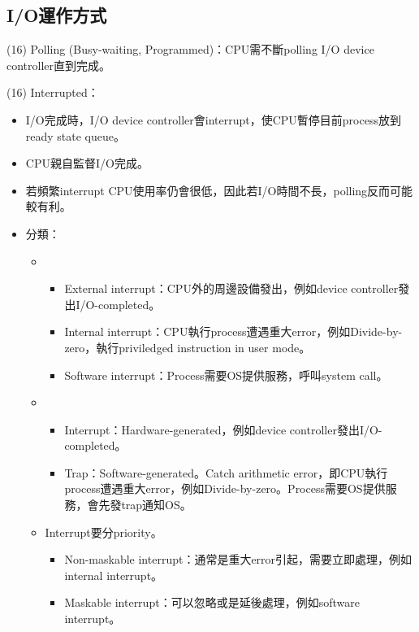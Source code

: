 \subsection{I/O運作方式}

\begin{theorem}{(16)} Polling (Busy-waiting, Programmed)：CPU需不斷polling I/O device controller直到完成。
\end{theorem}

\begin{theorem}{(16)} Interrupted：\begin{itemize}
        \item I/O完成時，I/O device controller會interrupt，使CPU暫停目前process放到ready state queue。
        \item CPU親自監督I/O完成。
        \item 若頻繁interrupt CPU使用率仍會很低，因此若I/O時間不長，polling反而可能較有利。
        \item 分類：\begin{itemize}
            \item \begin{itemize}
                \item External interrupt：CPU外的周邊設備發出，例如device controller發出I/O-completed。
                \item Internal interrupt：CPU執行process遭遇重大error，例如Divide-by-zero，執行priviledged instruction in user mode。
                \item Software interrupt：Process需要OS提供服務，呼叫system call。
            \end{itemize}
            \item \begin{itemize}
                \item Interrupt：Hardware-generated，例如device controller發出I/O-completed。
                \item Trap：Software-generated。Catch arithmetic error，即CPU執行process遭遇重大error，例如Divide-by-zero。Process需要OS提供服務，會先發trap通知OS。
            \end{itemize}
            \item Interrupt要分priority。\begin{itemize}
                \item Non-maskable interrupt：通常是重大error引起，需要立即處理，例如internal interrupt。
                \item Maskable interrupt：可以忽略或是延後處理，例如software interrupt。
            \end{itemize}
        \end{itemize}
    \end{itemize}
\end{theorem}

